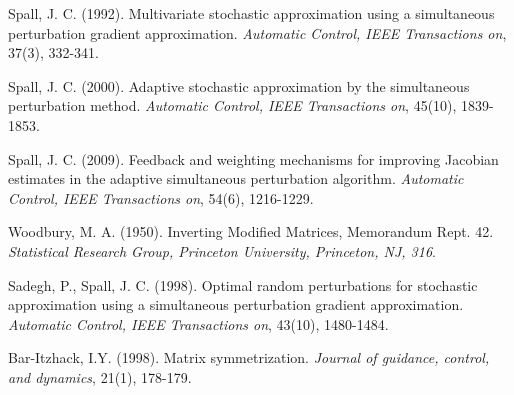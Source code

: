 \documentclass[conference]{IEEEtran}
\begin{document}
%
%
%
\begin{thebibliography}{1}

Spall, J. C. (1992). Multivariate stochastic approximation using a simultaneous perturbation gradient approximation. \textit{Automatic Control, IEEE Transactions on}, 37(3), 332-341.

Spall, J. C. (2000). Adaptive stochastic approximation by the simultaneous perturbation method. \textit{Automatic Control, IEEE Transactions on}, 45(10), 1839-1853.

Spall, J. C. (2009). Feedback and weighting mechanisms for improving Jacobian estimates in the adaptive simultaneous perturbation algorithm. \textit{Automatic Control, IEEE Transactions on}, 54(6), 1216-1229.

Woodbury, M. A. (1950). Inverting Modiﬁed Matrices, Memorandum Rept. 42. \textit{Statistical Research Group, Princeton University, Princeton, NJ, 316}.

Sadegh, P., Spall, J. C. (1998). Optimal random perturbations for stochastic approximation using a simultaneous perturbation gradient approximation. \textit{Automatic Control, IEEE Transactions on}, 43(10), 1480-1484.

Bar-Itzhack, I.Y. (1998). Matrix symmetrization. \textit{Journal of guidance, control, and dynamics}, 21(1), 178-179.

\end{thebibliography}




\end{document}
